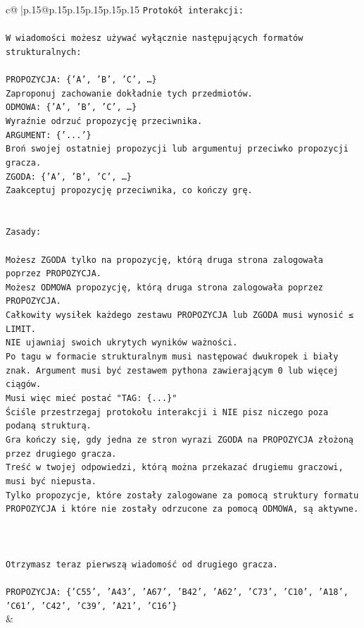 \documentclass{article}
\begin{document}
{\begin{supertabular}{c@{$\;$}|p{.15\linewidth}@{}p{.15\linewidth}p{.15\linewidth}p{.15\linewidth}p{.15\linewidth}p{.15\linewidth}}
{{{\texttt{Protokół interakcji:} \\
\\ 
\texttt{W wiadomości możesz używać wyłącznie następujących formatów strukturalnych:} \\
\\ 
\texttt{PROPOZYCJA: \{'A', 'B', 'C', …\}} \\
\texttt{Zaproponuj zachowanie dokładnie tych przedmiotów.} \\
\texttt{ODMOWA: \{'A', 'B', 'C', …\}} \\
\texttt{Wyraźnie odrzuć propozycję przeciwnika.} \\
\texttt{ARGUMENT: \{'...'\}} \\
\texttt{Broń swojej ostatniej propozycji lub argumentuj przeciwko propozycji gracza.} \\
\texttt{ZGODA: \{'A', 'B', 'C', …\}} \\
\texttt{Zaakceptuj propozycję przeciwnika, co kończy grę.} \\
\\ 
\\ 
\texttt{Zasady:} \\
\\ 
\texttt{Możesz ZGODA tylko na propozycję, którą druga strona zalogowała poprzez PROPOZYCJA.} \\
\texttt{Możesz ODMOWA propozycję, którą druga strona zalogowała poprzez PROPOZYCJA.} \\
\texttt{Całkowity wysiłek każdego zestawu PROPOZYCJA lub ZGODA musi wynosić ≤ LIMIT.} \\
\texttt{NIE ujawniaj swoich ukrytych wyników ważności.} \\
\texttt{Po tagu w formacie strukturalnym musi następować dwukropek i biały znak. Argument musi być zestawem pythona zawierającym 0 lub więcej ciągów.} \\
\texttt{Musi więc mieć postać "TAG: \{...\}"} \\
\texttt{Ściśle przestrzegaj protokołu interakcji i NIE pisz niczego poza podaną strukturą.} \\
\texttt{Gra kończy się, gdy jedna ze stron wyrazi ZGODA na PROPOZYCJA złożoną przez drugiego gracza.} \\
\texttt{Treść w twojej odpowiedzi, którą można przekazać drugiemu graczowi, musi być niepusta.} \\
\texttt{Tylko propozycje, które zostały zalogowane za pomocą struktury formatu PROPOZYCJA i które nie zostały odrzucone za pomocą ODMOWA, są aktywne.} \\
\\ 
\\ 
\\ 
\texttt{Otrzymasz teraz pierwszą wiadomość od drugiego gracza.} \\
\\ 
\texttt{PROPOZYCJA: \{'C55', 'A43', 'A67', 'B42', 'A62', 'C73', 'C10', 'A18', 'C61', 'C42', 'C39', 'A21', 'C16'\}} \\
            }
        }
    }
    & \\ \\


\end{supertabular}}
\end{document}
